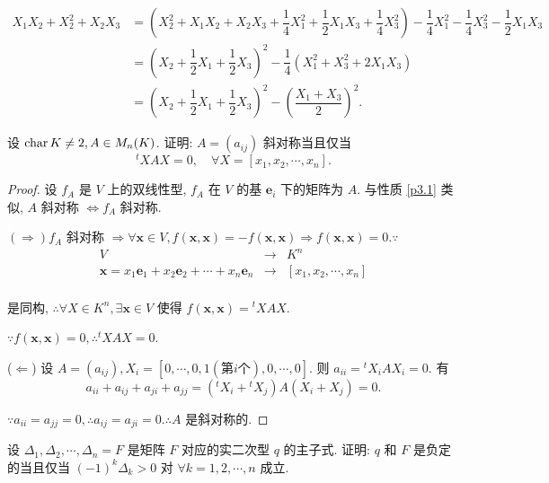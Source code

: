 \documentclass[color=black,device=normal,lang=cn,mode=geye]{elegantnote}
\begin{document}
\begin{solution}
    \begin{align*}
        X_1X_2+X_2^2+X_2X_3 & =\left(X_2^2+X_1X_2+X_2X_3+\dfrac{1}{4}X_1^2+\dfrac{1}{2}X_1X_3+\dfrac{1}{4}X_3^2\right)-\dfrac{1}{4}X_1^2-\dfrac{1}{4}X_3^2-\dfrac{1}{2}X_1X_3 \\
        & =\left(X_2+\dfrac{1}{2}X_1+\dfrac{1}{2}X_3\right)^2-\dfrac{1}{4}(X_1^2+X_3^2+2X_1X_3) \\
        & =\left(X_2+\dfrac{1}{2}X_1+\dfrac{1}{2}X_3\right)^2-\left(\dfrac{X_1+X_3}{2}\right)^2.
    \end{align*}
\end{solution}
\begin{exercisec}%
    设 $\operatorname{char}  K\neq 2,A\in M_n(K)$. 证明: $A=(a_{ij})$ 斜对称当且仅当
    \[{}^tXAX=0,\quad\forall X=[x_1,x_2,\cdots,x_n].\]
\end{exercisec}
\begin{proof}
    设 $f_A$ 是 $V$ 上的双线性型, $f_A$ 在 $V$ 的基 $\boldsymbol{e}_i$ 下的矩阵为 $A$. 与性质 \ref{p3.1} 类似, $A$ 斜对称 $\Leftrightarrow f_A$ 斜对称.

    $(\Rightarrow)f_A$ 斜对称 $\Rightarrow\forall\boldsymbol{x}\in V,f(\boldsymbol{x},\boldsymbol{x})=-f(\boldsymbol{x},\boldsymbol{x})\Rightarrow f(\boldsymbol{x},\boldsymbol{x})=0.\because$
    \[\begin{array}{rcl}
        V & \to & K^n \\
        \boldsymbol{x}=x_1\boldsymbol{e}_1+x_2\boldsymbol{e}_2+\cdots+x_n\boldsymbol{e}_n & \to & [x_1,x_2,\cdots,x_n] \\
    \end{array}\]

    是同构, $\therefore\forall X\in K^n,\exists\boldsymbol{x}\in V$ 使得 $f(\boldsymbol{x},\boldsymbol{x})={}^tXAX$.

    $\because f(\boldsymbol{x},\boldsymbol{x})=0,\therefore{}^tXAX=0$.

    ($\Leftarrow$) 设 $A=(a_{ij}),X_i=[0,\cdots,0,1(\text{第}i\text{个}),0,\cdots,0]$. 则 $a_{ii}={}^tX_iAX_i=0$. 有
    \[a_{ii}+a_{ij}+a_{ji}+a_{jj}=({}^tX_i+{}^tX_j)A(X_i+X_j)=0.\]

    $\because a_{ii}=a_{jj}=0,\therefore a_{ij}=a_{ji}=0.\therefore A$ 是斜对称的.
\end{proof}
\begin{exercise}\label{ex4.1}
    设 $\Delta_1,\Delta_2,\cdots,\Delta_n=F$ 是矩阵 $F$ 对应的实二次型 $q$ 的主子式. 证明: $q$ 和 $F$ 是负定的当且仅当 $(-1)^k\Delta_k>0$ 对 $\forall k=1,2,\cdots,n$ 成立.
\end{exercise}
\end{document}

